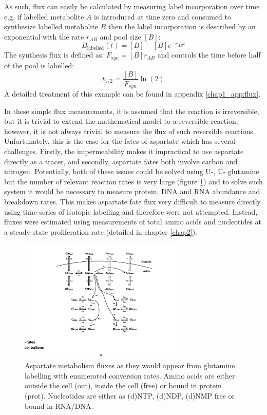 As such, flux can easily be calculated by measuring label incorporation over time e.g. if labelled metabolite $A$ is introduced at time zero and consumed to synthesize labelled metabolite $B$ then the label incorporation is described by an exponential with the rate $r_{AB}$ and pool size $[B]$:
$$
B_{\text{labelled}}(t) = [B] - [B] e^{-r_{AB} t}
$$
The synthesis flux is defined as: $F_{syn} = [B] r_{AB}$ and controls the time before half of the pool is labelled:
$$
t_{1/2} = \frac{[B]}{F_{syn}} \ln(2)
$$
A detailed treatment of this example can be found in appendix \ref{chap1_app:flux}.

In these simple flux measurements, it is assumed that the reaction is irreversible, but it is trivial to extend the mathematical model to a reversible reaction; however, it is not always trivial to measure the flux of such reversible reactions.
Unfortunately, this is the case for the fates of aspartate which has several challenges.
Firstly, the impermeability makes it impractical to use aspartate directly as a tracer, and secondly, aspartate fates both involve carbon and nitrogen.
Potentially, both of these issues could be solved using U-\hCi{}, U-\hNi{} glutamine but the number of relevant reaction rates is very large (figure \ref{fig:ch1:asp_fluxes}) and to solve such system it would be necessary to measure protein, DNA and RNA abundance and breakdown rates.
This makes aspartate fate flux very difficult to measure directly using time-series of isotopic labelling and therefore were not attempted.
Instead, fluxes were estimated using measurements of total amino acids and nucleotides at a steady-state proliferation rate (detailed in chapter \ref{chap2}).

\begin{figure}
    \centering
    \includegraphics[width=0.70\textwidth]{figures/chap1/asp_fluxes.pdf}
    \caption[Aspartate metabolism fluxes.]{
    Aspartate metabolism fluxes as they would appear from glutamine labelling with enumerated conversion rates.
    Amino acids are either outside the cell (out), inside the cell (free) or bound in protein (prot).
    Nucleotides are either as (d)NTP, (d)NDP, (d)NMP free or bound in RNA/DNA.
    }
    \label{fig:ch1:asp_fluxes}
\end{figure}





